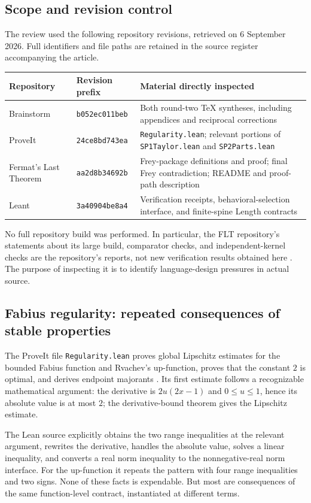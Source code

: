 \documentclass[11pt,a4paper]{article}
\theoremstyle{definition}
\theoremstyle{remark}
\newcommand{\code}[1]{\texttt{#1}}
\begin{document}
\subsection{Scope and revision control}
The review used the following repository revisions, retrieved on 6 September 2026. Full identifiers and file paths are retained in the source register accompanying the article.
\begin{center}
\begin{tabularx}{\textwidth}{@{}L{32mm}L{30mm}Y@{}}
\toprule
Repository & Revision prefix & Material directly inspected\\
\midrule
Brainstorm & \code{b052ec011beb} & Both round-two TeX syntheses, including appendices and reciprocal corrections\\
ProveIt & \code{24ce8bd743ea} & \code{Regularity.lean}; relevant portions of \code{SP1Taylor.lean} and \code{SP2Parts.lean}\\
Fermat's Last Theorem & \code{aa2d8b34692b} & Frey-package definitions and proof; final Frey contradiction; README and proof-path description\\
Leant & \code{3a40904be8a4} & Verification receipts, behavioral-selection interface, and finite-spine Length contracts\\
\bottomrule
\end{tabularx}
\end{center}
No full repository build was performed. In particular, the FLT repository's statements about its large build, comparator checks, and independent-kernel checks are the repository's reports, not new verification results obtained here \cite{fltReadme}. The purpose of inspecting it is to identify language-design pressures in actual source.

\subsection{Fabius regularity: repeated consequences of stable properties}
The ProveIt file \code{Regularity.lean} proves global Lipschitz estimates for the bounded Fabius function and Rvachev's up-function, proves that the constant $2$ is optimal, and derives endpoint majorants \cite{regularity}. Its first estimate follows a recognizable mathematical argument: the derivative is $2u(2x-1)$ and $0\le u\le1$, hence its absolute value is at most $2$; the derivative-bound theorem gives the Lipschitz estimate.

The Lean source explicitly obtains the two range inequalities at the relevant argument, rewrites the derivative, handles the absolute value, solves a linear inequality, and converts a real norm inequality to the nonnegative-real norm interface. For the up-function it repeats the pattern with four range inequalities and two signs. None of these facts is expendable. But most are consequences of the same function-level contract, instantiated at different terms.
\end{document}
